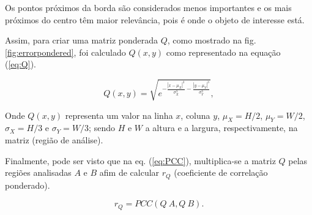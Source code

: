 Os pontos próximos da borda são considerados menos importantes e os mais próximos do centro 
têm maior relevância, pois é onde o objeto de interesse está.

Assim, para criar uma matriz ponderada $Q$, como mostrado na fig. \ref{fig:errorpondered},
foi calculado $Q(x,y)$ como representado na equação (\ref{eq:Q}).

\begin{equation}\label{eq:Q}
 Q(x,y) = \sqrt{e^{ -\frac{|x-\mu_X|^3}{\sigma_X^3}-\frac{|y-\mu_Y|^3}{\sigma_Y^3}  }},
\end{equation}

Onde $Q(x,y)$ representa um valor na linha $x$, coluna $y$,
$\mu_X=H/2$, $\mu_Y=W/2$, $\sigma_X=H/3$ e $\sigma_Y=W/3$; sendo $H$ e $W$
a altura e a largura, respectivamente, na matriz (região de análise).

Finalmente, pode ser visto que na eq. (\ref{eq:PCC}), multiplica-se a matriz $Q$ pelas 
regiões analisadas $A$ e $B$ afim de calcular $r_Q$ (coeficiente de correlação ponderado).

\begin{equation}\label{eq:rw}
 r_Q = PCC(Q~A, Q~B).
\end{equation}